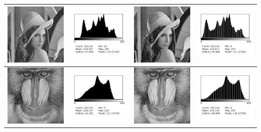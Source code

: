 \documentclass[a4paper,11pt]{article}
\begin{document}
  \begin{tabular}{|c|c|c|c|} 
   \hline
   \includegraphics[width=3cm]{lena512.png} & \includegraphics[width=3cm]{../histo/image/hist_lena512.png} & \includegraphics[width=3cm]{../res/lena512Q1.png} & \includegraphics[width=3cm]{../histo/resultat/hist_lena512Q1.png}\\
   \hline
   \includegraphics[width=3cm]{mandrill.png} & \includegraphics[width=3cm]{../histo/image/hist_mandrill.png} & \includegraphics[width=3cm]{../res/mandrillQ1.png} & \includegraphics[width=3cm]{../histo/resultat/hist_mandrillQ1.png}\\

\end{tabular}
\end{document}
